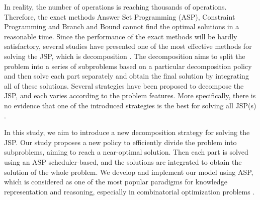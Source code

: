 \documentclass{tlp} %
\begin{document}

In reality, the number of operations is reaching thousands of operations. Therefore, the exact methods Answer Set Programming (ASP), Constraint Programming and Branch and Bound cannot find the optimal solutions in a reasonable time\cite{daneshamooz2021mathematical,shi2021solving,francescutto2021solving}. Since the performance of the exact methods will be hardly satisfactory, several studies have presented one of the most effective methods for solving the JSP, which is decomposition \cite{zhang2010hybrid}. The decomposition aims to split the problem into a series of subproblems based on a particular decomposition policy and then solve each part separately and obtain the final solution by integrating all of these solutions. Several strategies have been proposed to decompose the JSP, and each varies according to the problem features. More specifically, there is no evidence that one of the introduced strategies is the best for solving all JSP(s) \cite{ovacik2012decomposition}. 

In this study, we aim to introduce a new decomposition strategy for solving the JSP. Our study proposes a new policy to efficiently divide the problem into subproblems, aiming to reach a near-optimal solution. Then each part is solved using an ASP scheduler-based, and the solutions are integrated to obtain the solution of the whole problem. We develop and implement our model using ASP, which is considered as one of the most popular paradigms for knowledge representation and reasoning, especially in combinatorial optimization problems \cite{abseher2016shift}. 
\end{document}
